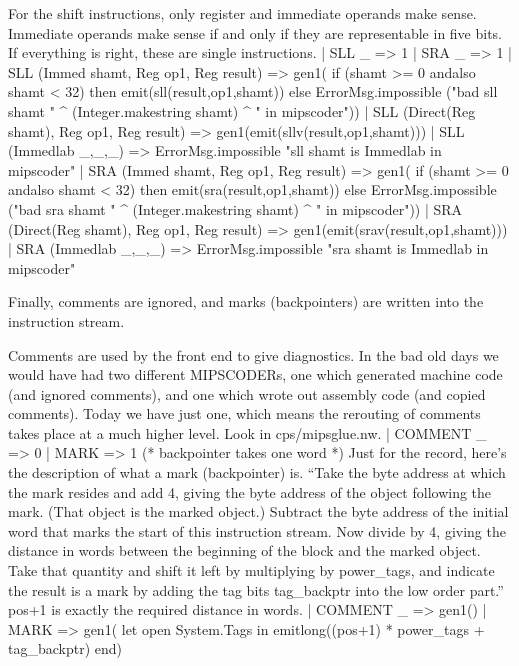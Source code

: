 For the shift instructions, only register and immediate operands
make sense.
Immediate operands make sense if and only if they are representable
in five bits.
If everything is right, these are single instructions.
\enddocs
{}
\endmoddef
| SLL _ => 1  
| SRA _ => 1
\endcode
{}
\endmoddef
| SLL (Immed shamt, Reg op1, Reg result) => gen1(
        if (shamt >= 0 andalso shamt < 32) then emit(sll(result,op1,shamt))
        else ErrorMsg.impossible ("bad sll shamt "
                ^ (Integer.makestring shamt) ^ " in mipscoder"))
| SLL (Direct(Reg shamt), Reg op1, Reg result) => 
        gen1(emit(sllv(result,op1,shamt)))
| SLL (Immedlab _,_,_) => ErrorMsg.impossible "sll shamt is Immedlab in mipscoder"
| SRA (Immed shamt, Reg op1, Reg result) => gen1(
        if (shamt >= 0 andalso shamt < 32) then emit(sra(result,op1,shamt))
        else ErrorMsg.impossible ("bad sra shamt "
                ^ (Integer.makestring shamt) ^ " in mipscoder"))
| SRA (Direct(Reg shamt), Reg op1, Reg result) =>
        gen1(emit(srav(result,op1,shamt)))
| SRA (Immedlab _,_,_) => ErrorMsg.impossible "sra shamt is Immedlab in mipscoder"
\endcode
{}

Finally, comments are ignored, and marks (backpointers) are written into the
instruction stream.

Comments are used by the front end to give diagnostics.
In the bad old days we would have had two different \code{}MIPSCODER\edoc{}s, one
which generated machine code (and ignored comments), and one which
wrote out assembly code (and copied comments).
Today we have just one, which means the rerouting of comments takes place
at a much higher level.  Look in \code{}cps/mipsglue.nw\edoc{}.
\enddocs
{}
\endmoddef
| COMMENT _ => 0
| MARK => 1                     (* backpointer takes one word *)
\endcode
{}
Just for the record, here's the description of what a mark (backpointer)
is.
``Take the byte address at which the mark resides and add 4, giving
the byte address of the object following the mark.
(That object is the marked object.)
Subtract the byte address of the initial word that marks the
start of this instruction stream.
Now divide by 4, giving the distance in words between the
beginning of the block and the marked object.
Take that quantity and shift it left by multiplying by \code{}power_tags\edoc{},
and indicate the result is a mark by adding the tag bits \code{}tag_backptr\edoc{}
into the low order part.''
 \code{}pos+1\edoc{} is exactly the required distance in words.
\enddocs
{}
\endmoddef
| COMMENT _ => gen1()
| MARK => gen1(
    let open System.Tags
    in  emitlong((pos+1) * power_tags + tag_backptr)
    end)
\endcode
{}

